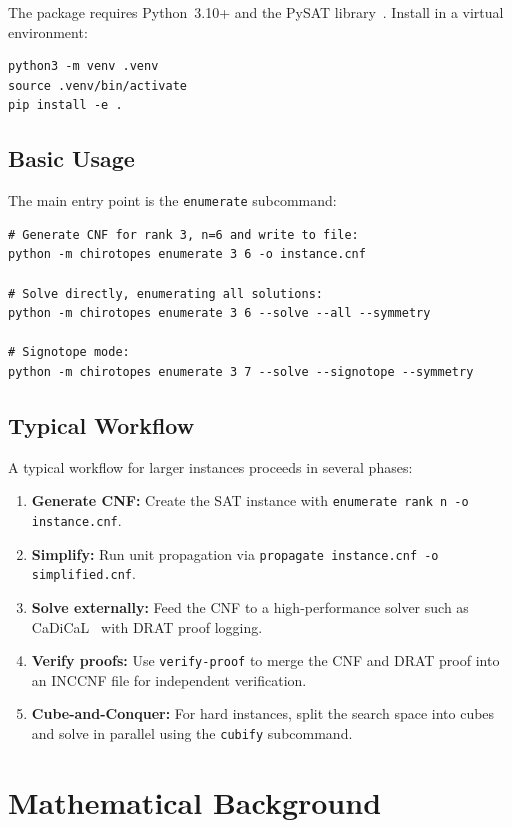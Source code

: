 \documentclass[11pt]{article}
\theoremstyle{definition}
\begin{document}
The package requires Python~3.10+ and the PySAT library~\cite{IMM2021}. Install in a virtual environment:

\begin{lstlisting}
python3 -m venv .venv
source .venv/bin/activate
pip install -e .
\end{lstlisting}

\subsection{Basic Usage}

The main entry point is the \texttt{enumerate} subcommand:

\begin{lstlisting}
# Generate CNF for rank 3, n=6 and write to file:
python -m chirotopes enumerate 3 6 -o instance.cnf

# Solve directly, enumerating all solutions:
python -m chirotopes enumerate 3 6 --solve --all --symmetry

# Signotope mode:
python -m chirotopes enumerate 3 7 --solve --signotope --symmetry
\end{lstlisting}

\subsection{Typical Workflow}

A typical workflow for larger instances proceeds in several phases:
\begin{enumerate}
\item \textbf{Generate CNF:} Create the SAT instance with \texttt{enumerate rank n -o instance.cnf}.
\item \textbf{Simplify:} Run unit propagation via \texttt{propagate instance.cnf -o simplified.cnf}.
\item \textbf{Solve externally:} Feed the CNF to a high-performance solver such as CaDiCaL~\cite{Biere2019} with DRAT proof logging.
\item \textbf{Verify proofs:} Use \texttt{verify-proof} to merge the CNF and DRAT proof into an INCCNF file for independent verification.
\item \textbf{Cube-and-Conquer:} For hard instances, split the search space into cubes and solve in parallel using the \texttt{cubify} subcommand.
\end{enumerate}

\section{Mathematical Background}
\end{document}
